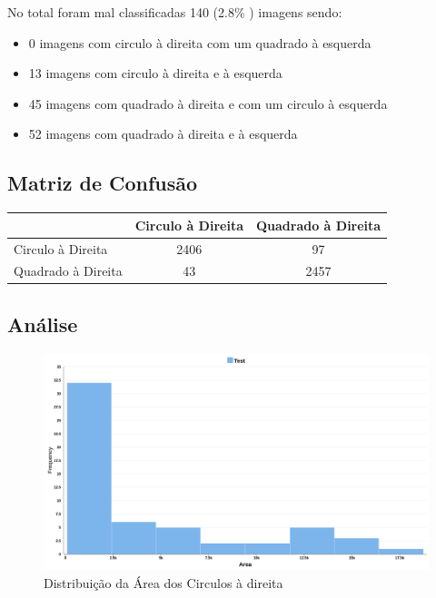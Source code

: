 No total foram mal classificadas 140 (2.8\% ) imagens sendo:
 \begin{itemize}
    \item 0 imagens com circulo à direita com um quadrado à esquerda
    \item 13 imagens com circulo à direita e à esquerda
    \item 45 imagens com quadrado à direita e com um circulo à esquerda 
    \item 52 imagens com quadrado à direita e à esquerda
\end{itemize}
    

\subsection{Matriz de Confusão}

\begin{table}[H]
\centering
\begin{tabular}{l|c c}
                & Circulo à Direita & Quadrado à Direita \\
\hline
Circulo à Direita         & 2406         & 97                  \\
Quadrado à Direita        & 43         & 2457                 \\

\end{tabular}
\end{table}

\subsection{Análise}
\begin{figure}[H]
    \centering
    \includegraphics[width=\textwidth]{imgs/Test_7/7_2/failed/car_ci_failed_area_hist.png}
    \caption{Distribuição da Área dos Circulos à direita }
    \label{fig:sub2}
\end{figure}

